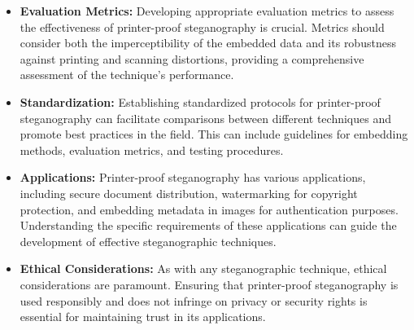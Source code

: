 \begin{itemize}
    \item \textbf{Evaluation Metrics:} Developing appropriate evaluation metrics to assess the effectiveness of printer-proof steganography is crucial. Metrics should consider both the imperceptibility of the embedded data and its robustness against printing and scanning distortions, providing a comprehensive assessment of the technique's performance.
    \item \textbf{Standardization:} Establishing standardized protocols for printer-proof steganography can facilitate comparisons between different techniques and promote best practices in the field. This can include guidelines for embedding methods, evaluation metrics, and testing procedures.
    \item \textbf{Applications:} Printer-proof steganography has various applications, including secure document distribution, watermarking for copyright protection, and embedding metadata in images for authentication purposes. Understanding the specific requirements of these applications can guide the development of effective steganographic techniques.
    \item \textbf{Ethical Considerations:} As with any steganographic technique, ethical considerations are paramount. Ensuring that printer-proof steganography is used responsibly and does not infringe on privacy or security rights is essential for maintaining trust in its applications.
\end{itemize}